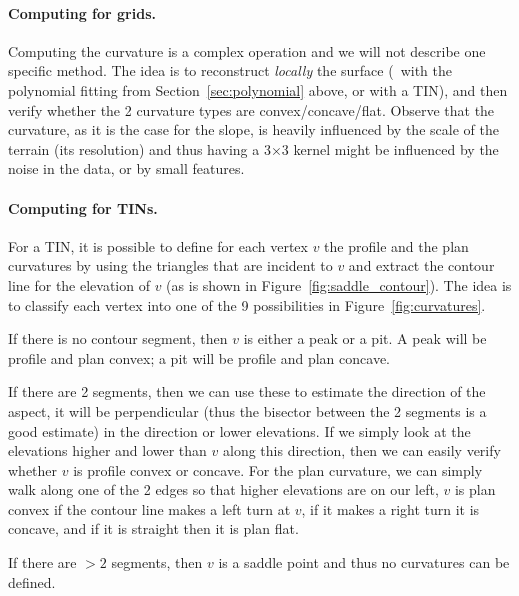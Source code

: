 \paragraph{Computing for grids.}
Computing the curvature is a complex operation and we will not describe one specific method.
The idea is to reconstruct \emph{locally} the surface (\eg\ with the polynomial fitting from Section~\ref{sec:polynomial} above, or with a TIN), and then verify whether the 2 curvature types are convex/concave/flat.
Observe that the curvature, as it is the case for the slope, is heavily influenced by the scale of the terrain (its resolution) and thus having a 3$\times$3 kernel might be influenced by the noise in the data, or by small features.


\paragraph{Computing for TINs.}
For a TIN, it is possible to define for each vertex $v$ the profile and the plan curvatures by using the triangles that are incident to $v$ and extract the contour line for the elevation of $v$ (as is shown in Figure~\ref{fig:saddle_contour}).
The idea is to classify each vertex into one of the 9 possibilities in Figure~\ref{fig:curvatures}.

If there is no contour segment, then $v$ is either a peak or a pit.
A peak will be profile and plan convex; a pit will be profile and plan concave.

If there are 2 segments, then we can use these to estimate the direction of the aspect, it will be perpendicular (thus the bisector between the 2 segments is a good estimate) in the direction or lower elevations.
If we simply look at the elevations higher and lower than $v$ along this direction, then we can easily verify whether $v$ is profile convex or concave.
For the plan curvature, we can simply walk along one of the 2 edges so that higher elevations are on our left, $v$ is plan convex if the contour line makes a left turn at $v$, if it makes a right turn it is concave, and if it is straight then it is plan flat.

If there are $>2$ segments, then $v$ is a saddle point and thus no curvatures can be defined.

%

